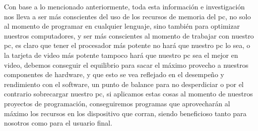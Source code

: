 \documentclass{article}
\begin{document}
Con base a lo mencionado anteriormente, toda esta información e investigación nos lleva a ser más conscientes del uso de los recursos de memoria del pc, no solo al momento de programar en cualquier lenguaje, sino también para optimizar nuestros computadores, y ser más conscientes al momento de trabajar con nuestro pc, es claro que tener el procesador más potente no hará que nuestro pc lo sea, o la tarjeta de video más potente tampoco hará que nuestro pc sea el mejor en video, debemos conseguir el equilibrio para sacar el máximo provecho a nuestros componentes de hardware, y que esto se vea reflejado en el desempeño y rendimiento con el software, un punto de balance para no desperdiciar o por el contrario sobrecargar nuestro pc, si aplicamos estas cosas al momento de nuestros proyectos de programación, conseguiremos programas que aprovecharán al máximo los recursos en los dispositivo que corran, siendo beneficioso tanto para nosotros como para el usuario final.


\vspace{4cm}










\end{document}
